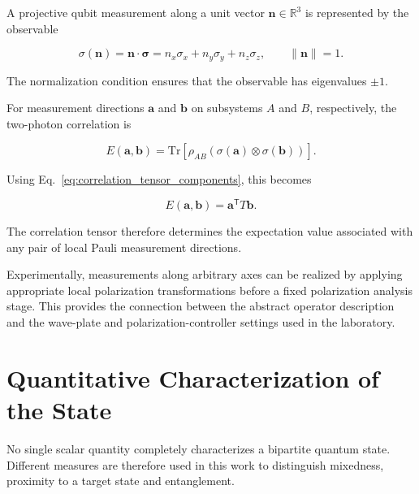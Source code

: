 A projective qubit measurement along a unit vector
\( \mathbf{n}\in\mathbb{R}^{3} \) is represented by the observable

\begin{equation}
\sigma(\mathbf{n})
=
\mathbf{n}\cdot\boldsymbol{\sigma}
=
n_x\sigma_x+n_y\sigma_y+n_z\sigma_z,
\qquad
\|\mathbf{n}\|=1.
\label{eq:measurement_operator_axis}
\end{equation}

The normalization condition ensures that the observable has eigenvalues
\( \pm1 \).

For measurement directions \( \mathbf{a} \) and \( \mathbf{b} \) on subsystems
\(A\) and \(B\), respectively, the two-photon correlation is

\begin{equation}
E(\mathbf{a},\mathbf{b})
=
\mathrm{Tr}
\left[
\rho_{AB}
\left(
\sigma(\mathbf{a})\otimes\sigma(\mathbf{b})
\right)
\right].
\label{eq:axis_correlation_trace}
\end{equation}

Using Eq.~\eqref{eq:correlation_tensor_components}, this becomes

\begin{equation}
E(\mathbf{a},\mathbf{b})
=
\mathbf{a}^{\mathsf T}
T
\mathbf{b}.
\label{eq:axis_correlation_tensor_form}
\end{equation}

The correlation tensor therefore determines the expectation value associated with
any pair of local Pauli measurement directions.

Experimentally, measurements along arbitrary axes can be realized by applying
appropriate local polarization transformations before a fixed polarization
analysis stage. This provides the connection between the abstract operator
description and the wave-plate and polarization-controller settings used in the
laboratory.


\section{Quantitative Characterization of the State}
\label{sec:quantitative_state_characterization}

No single scalar quantity completely characterizes a bipartite quantum state.
Different measures are therefore used in this work to distinguish mixedness,
proximity to a target state and entanglement.

